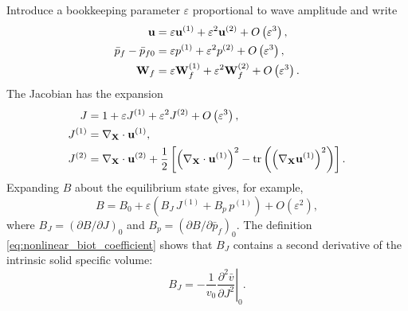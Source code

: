 \documentclass[11pt]{article}
\newcommand{\mbf}[1]{\mathbf{#1}}
\newcommand{\tr}{\operatorname{tr}}
\begin{document}
Introduce a bookkeeping parameter \(\varepsilon\) proportional to wave
amplitude and write
\begin{align}
    \mbf u
    & =\varepsilon\mbf u^{(1)}
    +\varepsilon^2\mbf u^{(2)}+O\left(\varepsilon^3\right),
    \notag\\
    \bar p_f-\bar p_{f0}
    & =\varepsilon p^{(1)}
    +\varepsilon^2p^{(2)}+O\left(\varepsilon^3\right),
    \notag\\
    \mbf W_f
    & =\varepsilon\mbf W_f^{(1)}
    +\varepsilon^2\mbf W_f^{(2)}+O\left(\varepsilon^3\right).
    \label{eq:field_expansions}
\end{align}
The Jacobian has the expansion
\begin{align}
    J
    & =1+\varepsilon J^{(1)}+\varepsilon^2J^{(2)}
    +O\left(\varepsilon^3\right),
    \notag\\
    J^{(1)}
    & =\nabla_{\mbf X}\cdot\mbf u^{(1)},
    \notag\\
    J^{(2)}
    & =\nabla_{\mbf X}\cdot\mbf u^{(2)}
    +\frac{1}{2}
    \left[
    \left(\nabla_{\mbf X}\cdot\mbf u^{(1)}\right)^2
    -\tr\left(\left(\nabla_{\mbf X}\mbf u^{(1)}\right)^2\right)
    \right].
    \label{eq:jacobian_expansion}
\end{align}
Expanding \(B\) about the equilibrium state gives, for example,
\begin{equation}
    B
    =B_0+\varepsilon
    \left(B_J\,J^{(1)}+B_p\,p^{(1)}\right)
    +O\left(\varepsilon^2\right),
    \label{eq:biot_expansion}
\end{equation}
where \(B_J=(\partial B/\partial J)_0\) and
\(B_p=(\partial B/\partial\bar p_f)_0\).  The definition
\eqref{eq:nonlinear_biot_coefficient} shows that \(B_J\) contains a second
derivative of the intrinsic solid specific volume:
\begin{equation}
    B_J
    =-\frac{1}{v_0}
    \left.
    \frac{\partial^2\bar v}{\partial J^2}
    \right|_0.
    \label{eq:biot_slope_specific_volume}
\end{equation}
\end{document}
